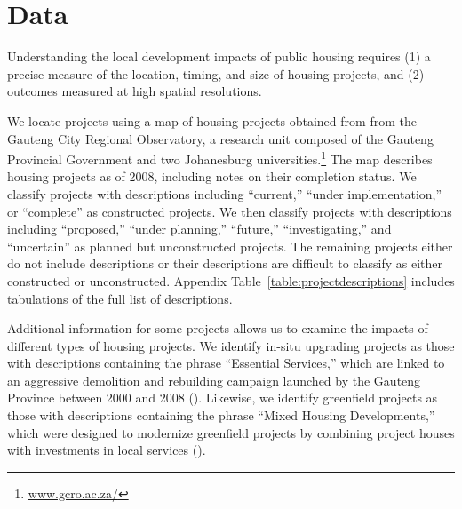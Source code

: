 \documentclass[12pt]{article}
\begin{document}
\section{Data}\label{section:data}


Understanding the local development impacts of public housing requires (1) a precise measure of the location, timing, and size of housing projects, and (2) outcomes measured at high spatial resolutions.

We locate projects using a map of housing projects obtained from from the Gauteng City Regional Observatory, a research unit composed of the Gauteng Provincial Government and two Johanesburg universities.\footnote{\href{url}{www.gcro.ac.za/}} The map describes housing projects as of 2008, including notes on their completion status.  We classify projects with descriptions including ``current,'' ``under implementation,'' or ``complete'' as constructed projects.  We then classify projects with descriptions including ``proposed,'' ``under planning,'' ``future,'' ``investigating,'' and ``uncertain'' as planned but unconstructed projects.  The remaining projects either do not include descriptions or their descriptions are difficult to classify as either constructed or unconstructed.  Appendix Table~\ref{table:projectdescriptions} includes tabulations of the full list of descriptions.  


Additional information for some projects allows us to examine the impacts of different types of housing projects.  We identify in-situ upgrading projects as those with descriptions containing the phrase ``Essential Services,'' which are linked to an aggressive demolition and rebuilding campaign launched by the Gauteng Province between 2000 and 2008 (\cite{hofmeyr2008risk}).  Likewise, we identify greenfield projects as those with descriptions containing the phrase ``Mixed Housing Developments,'' which were designed to modernize greenfield projects by combining project houses with investments in local services (\cite{greenfield}).
\end{document}
